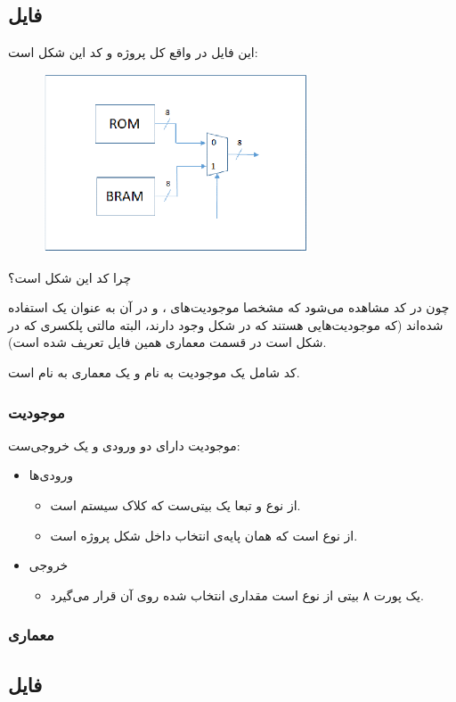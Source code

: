 \documentclass[dvipsnames, svgnames, x11names, a4paper, 11pt]{article}
\begin{document}
\subsection{فایل }
این فایل در واقع کل پروژه و کد این شکل است:
\begin{figure}[H]
\begin{center}
\includegraphics[width=0.7\textwidth, height=0.3\textheight]{images/project}
\end{center}
\end{figure}
چرا کد این شکل است؟

چون در کد مشاهده‌ می‌شود که مشخصا موجودیت‌های 
،
و
در آن به عنوان یک 
استفاده شده‌اند (که موجودیت‌هایی هستند که در شکل وجود دارند، البته مالتی پلکسری که در شکل است در قسمت معماری همین فایل تعریف شده است).

کد شامل یک موجودیت به نام
و یک معماری به نام
است.

\subsubsection{موجودیت }
موجودیت دارای دو ورودی و یک خروجی‌ست:
\begin{itemize}
\item 
ورودی‌ها

\begin{itemize}
\item {}

از نوع 
و تبعا یک بیتی‌ست که کلاک سیستم است.

\item  {}

از نوع 
است که همان پایه‌ی انتخاب داخل شکل پروژه است.

\end{itemize}

\item 
خروجی
\begin{itemize}
\item {}

یک پورت ۸ بیتی از نوع 
است مقداری انتخاب شده روی آن قرار می‌گیرد.

\end{itemize}

\end{itemize}
\subsubsection{معماری }

\subsection{فایل }
\end{document}
